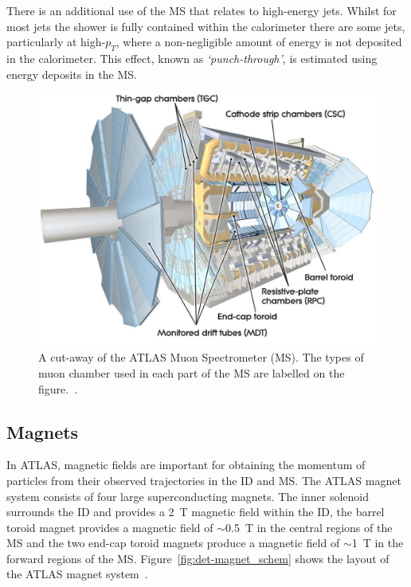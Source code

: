 There is an additional use of the MS that relates to high-energy jets.
Whilst for most jets the shower is fully contained within the calorimeter
there are some jets, particularly at high-$p_T$, where a non-negligible amount of energy is not deposited in the calorimeter.
This effect, known as \textit{`punch-through'}, is estimated using energy deposits in the MS.

\begin{figure}[!htb]
  \begin{center}
    \includegraphics[width=0.8\linewidth, angle=0]{figs/Detector/MS_schem.pdf}
  \end{center}
  \caption[A cut-away of the ATLAS Muon Spectrometer.]
          {A cut-away of the ATLAS Muon Spectrometer (MS). The types of muon chamber used in each part of the MS are labelled on the figure.~\cite{det-ATLAS_Exp}.}
  \label{fig:det-ms_schem}
\end{figure}

\newpage

\subsection{Magnets}
\label{sec:det-magnets}

In ATLAS, magnetic fields are important for obtaining the momentum of particles from their observed trajectories in the ID and MS.
The ATLAS magnet system consists of four large superconducting magnets.
The inner solenoid surrounds the ID and provides a 2~T magnetic field within the ID,
the barrel toroid magnet provides a magnetic field of $\sim$0.5~T in the central regions of the MS and
the two end-cap toroid magnets produce a magnetic field of $\sim$1~T in the forward regions of the MS.
Figure~\ref{fig:det-magnet_schem} shows the layout of the ATLAS magnet system~\cite{det-magnet_fig}.

